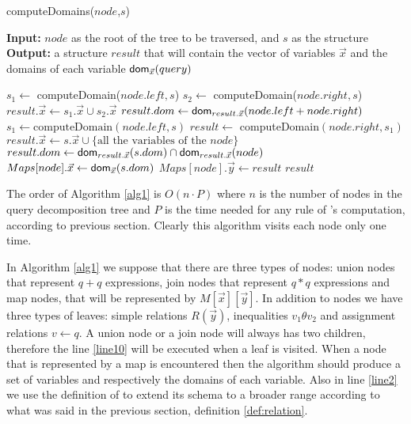 \documentclass[12pt]{article}
\begin{document}
\begin{algorithm}[H]
\caption{computeDomains($node$,$s$)} 
\label{alg1}
\textbf{Input:} $node$ as the root of the tree to be traversed, and $s$ as the structure \\
\textbf{Output:} a structure $result$ that will contain the vector of variables $\vec x$ and the domains of each variable $\textsf{dom}{}_{\vec x}(query)$
\begin{algorithmic}[1]
\STATE  $s_{1}\gets$ computeDomain($node$.$left, s$)
\STATE  $s_{2}\gets$ computeDomain($node.right, s$)
\STATE  $result.\vec{x}\gets s_{1}.\vec{x} \cup s_{2}.\vec{x}$ 
\STATE  $result.dom\gets \text{\textsf{dom}}_{result.\vec x}(node.left + node.right)$
\label{line:join1}
\STATE  $s_{1} \gets \text{computeDomain}(node.left, s)$
\label{line:join2}
\STATE $result\gets$ computeDomain$(node.right, s_{1})$
\ELSE 
\label{line10}
\STATE $result.\vec{x}\gets s.\vec{x} \cup \{\text{all the variables of the $node$}\}$
\STATE $result.dom\gets \text{\textsf{dom}}_{result.\vec{x}}(s.dom)\cap\text{\textsf{dom}}_{result.\vec{x}}(node)$\label{line2}
\ENDIF
{}
\STATE $Maps[node].\vec{x}\gets\text{\textsf{dom}}_{\vec{x}}(s.dom)$
\STATE $Maps[node].\vec{y}\gets result$
\ENDIF
\RETURN $result$
\end{algorithmic}
\end{algorithm}

The order of Algorithm \ref{alg1} is $O(n\cdot P)$ where $n$ is the number of nodes in the query decomposition tree and $P$ is the time needed for any rule of \dom{}'s computation, according to previous section. Clearly this algorithm visits each node only one time. 

In Algorithm \ref{alg1} we suppose that there are three types of nodes: union nodes that represent $q+q$ expressions, join nodes that represent $q*q$ expressions and map nodes, that will be represented by $M[\vec x][\vec y]$. In addition to nodes we have three types of leaves: simple relations $R(\vec y)$, inequalities $v_{1}\theta v_{2}$ and assignment relations $v \gets q$. A union node or a join node will always has two children, therefore the line \ref{line10} will be executed when a leaf is visited. When a node that is represented by a map is encountered then the algorithm should produce a set of variables and respectively the domains of each variable. Also in line \ref{line2} we use the definition of \dom{} to extend its schema to a broader range according to what was said in the previous section, definition \eqref{def:relation}. 
\end{document}
